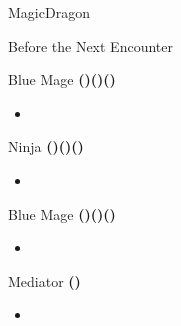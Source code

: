 \begin{paracol}{2}
\switchcolumn
\begin{encounter}{MagicDragon}
	\varwb
	\begin{notes}
		\item {}
	\end{notes}
	\begin{round}{1}
		\cara \leftCommand{\throw} \then \thunderScroll
        \bartz \rightCommand{\gilToss}
        \item {}
        \faris \leftCommand{\catch}
	\end{round}
	\varwe
\end{encounter}

\begin{menu}{Before the Next Encounter}
    \varwb
    \begin{jobMenu}
        \faris Blue Mage \textbf{(\pointDown)(\pointLeft)(\pointDown)} \ability{!\gilToss}
        \begin{itemize}
            \item[] \equip{\iceShield}
        \end{itemize}
        \bartz Ninja \textbf{(\pointLeft)(\pointDown)(\pointLeft)} \ability{!\escape}
        \begin{itemize}
            \item[] \equip{\boneMail}
        \end{itemize}
        \lenna Blue Mage \textbf{(\pointDown)(\pointLeft)(\pointDown)} \ability{!\control}
        \begin{itemize}
            \item[] \optimize
        \end{itemize}
        \cara Mediator \textbf{(\pointUp)} \ability{\learning}
        \begin{itemize}
            \item[] \optimize
        \end{itemize}
    \end{jobMenu}
    \begin{itemMenu}
        \hiPotionMenu {}
    \end{itemMenu}
    \varwe
\end{menu}


\end{paracol}
